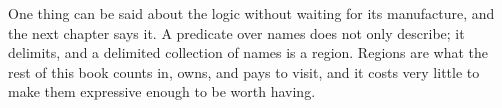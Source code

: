 One thing can be said about the logic without waiting for its
manufacture, and the next chapter says it.
A predicate over names does not only describe; it delimits, and a
delimited collection of names is a region.
Regions are what the rest of this book counts in, owns, and pays to
visit, and it costs very little to make them expressive enough to
be worth having.
